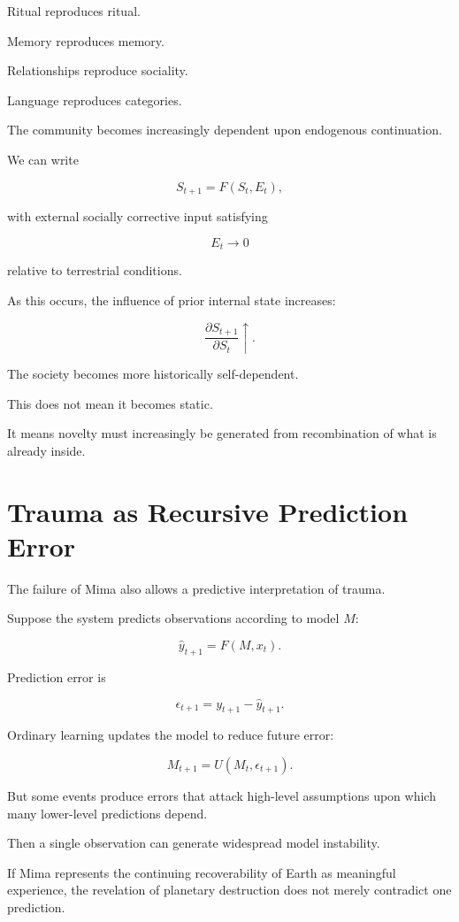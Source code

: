\documentclass[11pt,oneside]{book}
\theoremstyle{definition}
\theoremstyle{remark}
\begin{document}
Ritual reproduces ritual.

Memory reproduces memory.

Relationships reproduce sociality.

Language reproduces categories.

The community becomes increasingly dependent upon endogenous continuation.

We can write

\[
S_{t+1}
=
F(S_t,E_t),
\]

with external socially corrective input satisfying

\[
E_t\rightarrow0
\]

relative to terrestrial conditions.

As this occurs, the influence of prior internal state increases:

\[
\frac{\partial S_{t+1}}
{\partial S_t}
\uparrow.
\]

The society becomes more historically self-dependent.

This does not mean it becomes static.

It means novelty must increasingly be generated from recombination of what is already inside.

\section{Trauma as Recursive Prediction Error}

The failure of Mima also allows a predictive interpretation of trauma.

Suppose the system predicts observations according to model \(M\):

\[
\hat y_{t+1}
=
F(M,x_t).
\]

Prediction error is

\[
\epsilon_{t+1}
=
y_{t+1}-\hat y_{t+1}.
\]

Ordinary learning updates the model to reduce future error:

\[
M_{t+1}
=
U(M_t,\epsilon_{t+1}).
\]

But some events produce errors that attack high-level assumptions upon which many lower-level predictions depend.

Then a single observation can generate widespread model instability.

If Mima represents the continuing recoverability of Earth as meaningful experience, the revelation of planetary destruction does not merely contradict one prediction.
\end{document}
